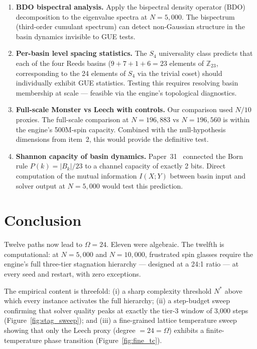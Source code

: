 \documentclass[11pt,a4paper]{article}
\begin{document}
\begin{enumerate}
\item \textbf{BDO bispectral analysis.}
Apply the bispectral density operator (BDO) decomposition to the eigenvalue spectra at $N = 5{,}000$.
The bispectrum (third-order cumulant spectrum) can detect non-Gaussian structure in the basin dynamics invisible to GUE tests.

\item \textbf{Per-basin level spacing statistics.}
The $S_4$ universality class predicts that each of the four Reeds basins ($9 + 7 + 1 + 6 = 23$ elements of $\mathbb{Z}_{23}$, corresponding to the 24 elements of $S_4$ via the trivial coset) should individually exhibit GUE statistics.
Testing this requires resolving basin membership at scale --- feasible via the engine's topological diagnostics.

\item \textbf{Full-scale Monster vs Leech with controls.}
Our comparison used $N/10$ proxies.
The full-scale comparison at $N = 196{,}883$ vs $N = 196{,}560$ is within the engine's 500M-spin capacity.
Combined with the null-hypothesis dimensions from item~2, this would provide the definitive test.

\item \textbf{Shannon capacity of basin dynamics.}
Paper~31~\cite{dwr_papers} connected the Born rule $P(k) = |B_k|/23$ to a channel capacity of exactly 2 bits.
Direct computation of the mutual information $I(X; Y)$ between basin input and solver output at $N = 5{,}000$ would test this prediction.
\end{enumerate}


\section{Conclusion}\label{sec:conclusion}

Twelve paths now lead to $\Omega = 24$.
Eleven were algebraic.
The twelfth is computational: at $N = 5{,}000$ and $N = 10{,}000$, frustrated spin glasses require the engine's full three-tier stagnation hierarchy --- designed at a 24:1 ratio --- at every seed and restart, with zero exceptions.

The empirical content is threefold: (i) a sharp complexity threshold $N^*$ above which every instance activates the full hierarchy; (ii) a step-budget sweep confirming that solver quality peaks at exactly the tier-3 window of 3{,}000 steps (Figure~\ref{fig:stag_sweep}); and (iii) a fine-grained lattice temperature sweep showing that only the Leech proxy (degree $= 24 = \Omega$) exhibits a finite-temperature phase transition (Figure~\ref{fig:fine_tc}).
\end{document}
